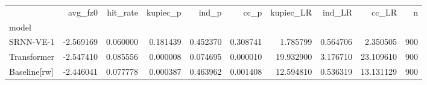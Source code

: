 \begin{tabular}{lrrrrrrrrr}
\toprule
 & avg_fz0 & hit_rate & kupiec_p & ind_p & cc_p & kupiec_LR & ind_LR & cc_LR & n \\
model &  &  &  &  &  &  &  &  &  \\
\midrule
SRNN-VE-1 & -2.569169 & 0.060000 & 0.181439 & 0.452370 & 0.308741 & 1.785799 & 0.564706 & 2.350505 & 900 \\
Transformer & -2.547410 & 0.085556 & 0.000008 & 0.074695 & 0.000010 & 19.932900 & 3.176710 & 23.109610 & 900 \\
Baseline[rw] & -2.446041 & 0.077778 & 0.000387 & 0.463962 & 0.001408 & 12.594810 & 0.536319 & 13.131129 & 900 \\
\bottomrule
\end{tabular}
